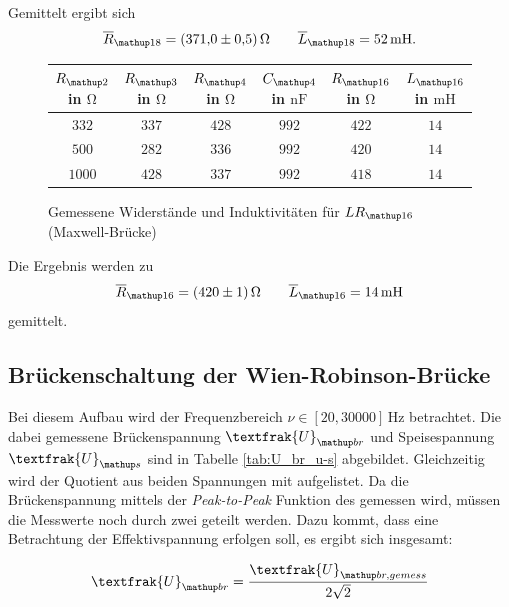 Gemittelt ergibt sich
\begin{equation}
\label{eq:wert_lr_16_max}
\overline{R}_{\map{18}}=\SI{371\pm0.5}{\ohm} \qquad \overline{L}_{\map{18}}=\SI{52}{\milli\henry}.
\end{equation}


\begin{figure}
\centering
\caption{Gemessene Widerstände und Induktivitäten für $LR\ua{16}$ (Maxwell-Brücke)}
  \label{tab:lc_r16_max}
\begin{tabular}{S S S S S S }
    \toprule
    {$R\ua{2}$  in $\si{\ohm}$} &  {$R\ua{3}$ in $\si{\ohm}$} & {$R\ua{4}$ in $\si{\ohm}$} & {$C\ua{4}$ in $\si{\nano\farad}$}& {$R\ua{16}$ in $\si{\ohm}$} &  {$L\ua{16}$ in $\si{\milli\henry}$} \\
    \midrule
     {$\num{332}$} & {$\num{337}$} &  {$\num{428}$}& {$\num{992}$}  &  {$\num{422}$} & {$\num{14}$}\\
     {$\num{500}$} & {$\num{282}$}  & {$\num{336}$} & {$\num{992}$} & {$\num{420}$} & {$\num{14}$}\\
     {$\num{1000}$} & {$\num{428}$}  & {$\num{337}$} & {$\num{992}$} &{$\num{418}$} & {$\num{14}$}  \\
    \bottomrule
  \end{tabular}
 \end{figure}


Die Ergebnis werden zu %
\begin{equation}
\label{eq:wert_lr_16_max}
\overline{R}_{\map{16}}=\SI{420\pm1}{\ohm} \qquad \overline{L}_{\map{16}}=\SI{14}{\milli\henry}
\end{equation}
gemittelt.

\subsection{Brückenschaltung der Wien-Robinson-Brücke}

Bei diesem Aufbau wird der Frequenzbereich $\nu\in\left[20,30000\right]\,\si{\hertz}$ betrachtet.
Die dabei gemessene Brückenspannung $\textfrak{U}\ua{br}$ und Speisespannung $\textfrak{U}\ua{s}$ sind in Tabelle \ref{tab:U_br_u-s} abgebildet.
Gleichzeitig wird der Quotient aus beiden Spannungen mit aufgelistet.
Da die Brückenspannung mittels der \emph{Peak-to-Peak} Funktion des gemessen wird,
müssen die Messwerte noch durch zwei geteilt werden. Dazu kommt, dass eine Betrachtung der Effektivspannung erfolgen soll, es ergibt sich insgesamt:


\begin{equation*}
\textfrak{U}\ua{br}=\frac{\textfrak{U}\ua{br,gemess}}{2\sqrt{2}}
\end{equation*}



